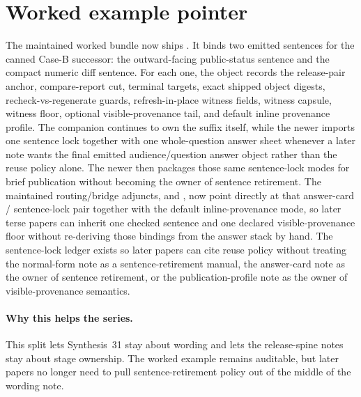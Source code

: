 \documentclass[11pt]{article}
\begin{document}
\section{Worked example pointer}
The maintained worked bundle now ships .\cite{series:workedexample}
It binds two emitted sentences for the canned Case-B successor: the outward-facing public-status sentence and the compact numeric diff sentence.
For each one, the object records the release-pair anchor, compare-report cut, terminal targets, exact shipped object digests, recheck-vs-regenerate guards, refresh-in-place witness fields, witness capsule, witness floor, optional visible-provenance tail, and default inline provenance profile.
The companion  continues to own the suffix itself, while the newer  imports one sentence lock together with one whole-question answer sheet whenever a later note wants the final emitted audience/question answer object rather than the reuse policy alone. The newer  then packages those same sentence-lock modes for brief publication without becoming the owner of sentence retirement. The maintained routing/bridge adjuncts,  and , now point directly at that answer-card / sentence-lock pair together with the default inline-provenance mode, so later terse papers can inherit one checked sentence and one declared visible-provenance floor without re-deriving those bindings from the answer stack by hand. The sentence-lock ledger exists so later papers can cite reuse policy without treating the normal-form note as a sentence-retirement manual, the answer-card note as the owner of sentence retirement, or the publication-profile note as the owner of visible-provenance semantics.\cite{series:downstreamnormalforms,series:challengeanswercards,series:challengeanswerpublicationprofiles,series:seriesspines}

\paragraph{Why this helps the series.}
This split lets Synthesis~31 stay about wording and lets the release-spine notes stay about stage ownership.
The worked example remains auditable, but later papers no longer need to pull sentence-retirement policy out of the middle of the wording note.
\end{document}
